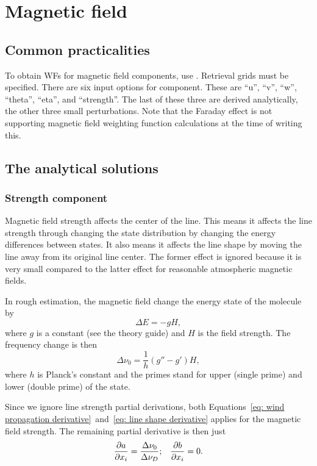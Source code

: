 \section{Magnetic field}
\label{sec:wfuns:magneticfield}

\subsection{Common practicalities}
%
To obtain WFs for magnetic field components, use .
 Retrieval grids must be specified.  There are six input options for component.
 These are ``u'', ``v'', ``w'', ``theta'', ``eta'', and ``strength''.  The 
 last of these three are derived analytically, the other three small
 perturbations.  Note that the Faraday effect is not supporting magnetic field
 weighting function calculations at the time of writing this.

\subsection{The analytical solutions}

\subsubsection{Strength component}
Magnetic field strength affects the center of the line.  This means it affects the line 
strength through changing the state distribution by changing the energy differences 
between states.  It also means it affects the line shape by moving the line away from its 
original line center.  The former effect is ignored because it is very small 
compared to the latter effect for reasonable atmospheric magnetic fields.

In rough estimation, the magnetic field change the energy state of the molecule by
\begin{equation}
  \Delta E = -g H,
\end{equation}
where $g$ is a constant (see the theory guide) and $H$ is the field strength.  The frequency change
is then
\begin{equation}
  \Delta \nu_0 = \frac{1}{h}\left(g''-g'\right)H,
\end{equation}
where $h$ is Planck's constant and the primes stand for upper (single prime)
and lower (double prime) of the state.

Since we ignore line strength partial derivations,
both Equations~\ref{eq: wind propagation derivative}~and~\ref{eq: line shape derivative}
applies for the magnetic field strength. The remaining partial derivative is then just
\begin{equation}
  \frac{\partial a}{\partial x_i} = \frac{\Delta \nu_0}{\Delta\nu_D};\;\;\;\frac{\partial b}{\partial x_i}=0.
\end{equation}

